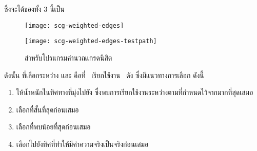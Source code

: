ซึ่งจะได้{\scg}ของทั้ง 3 {\class}นี้เป็น

\begin{figure}[ht!]
    \centering
    \begin{minipage}{.8\textwidth}
        \centering
        \texttt{[image: scg-weighted-edges]}
        \label{fig:scgWeightedEdge}
    \end{minipage}
    \begin{minipage}{.8\textwidth}
        \centering
        \texttt{[image: scg-weighted-edges-testpath]}
        \label{fig:scgWeightedEdgeTestPathSelected}
    \end{minipage}
    \caption{{\scg}สำหรับโปรแกรมคำนวณเกรดนิสิต}
    \label{fig:scgCallGraph}
\end{figure}

ดังนั้น {\TestPath}ที่เลือกระหว่าง  และ  คือ{\Path}ที่\class\  
เรียกใช้งาน{\method}\  ดัง ซึ่งมีแนวทางการเลือก{\TestPath} ดังนี้

\begin{enumerate}
    \item ให้น้ำหนักในทิศทางที่มุ่งไปยัง{\Node} ซึ่งพบการเรียกใช้งานระหว่าง{\class}ตามที่กำหนดไว้จาก{\scg}มากที่สุดเสมอ
    \item เลือก{\TestPath}ที่สั้นที่สุดก่อนเสมอ
    \item เลือก{\TestPath}ที่พบ{\PredicateNode}น้อยที่สุดก่อนเสมอ
    \item เลือก{\TestPath}ไปยังทิศที่ทำให้{\PredicateNode}มีค่าความจริงเป็นจริงก่อนเสมอ
\end{enumerate}

